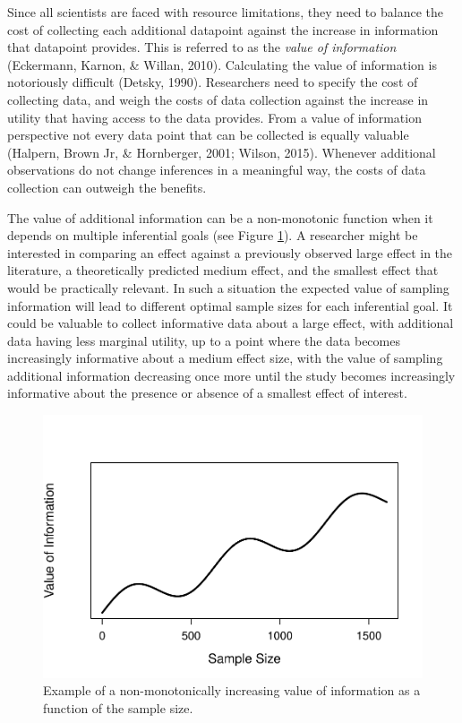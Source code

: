 \documentclass[
  english,
  ,jou, a4paper,floatsintext]{apa6}
\begin{document}
Since all scientists are faced with resource limitations, they need to balance the cost of collecting each additional datapoint against the increase in information that datapoint provides. This is referred to as the \emph{value of information} (Eckermann, Karnon, \& Willan, 2010). Calculating the value of information is notoriously difficult (Detsky, 1990). Researchers need to specify the cost of collecting data, and weigh the costs of data collection against the increase in utility that having access to the data provides. From a value of information perspective not every data point that can be collected is equally valuable (Halpern, Brown Jr, \& Hornberger, 2001; Wilson, 2015). Whenever additional observations do not change inferences in a meaningful way, the costs of data collection can outweigh the benefits.

The value of additional information can be a non-monotonic function when it depends on multiple inferential goals (see Figure \ref{fig:non-monotonic}). A researcher might be interested in comparing an effect against a previously observed large effect in the literature, a theoretically predicted medium effect, and the smallest effect that would be practically relevant. In such a situation the expected value of sampling information will lead to different optimal sample sizes for each inferential goal. It could be valuable to collect informative data about a large effect, with additional data having less marginal utility, up to a point where the data becomes increasingly informative about a medium effect size, with the value of sampling additional information decreasing once more until the study becomes increasingly informative about the presence or absence of a smallest effect of interest.

\begin{figure}
\centering
\includegraphics{sample_size_justification_files/figure-latex/non-monotonic-1.pdf}
\caption{\label{fig:non-monotonic}Example of a non-monotonically increasing value of information as a function of the sample size.}
\end{figure}
\end{document}
